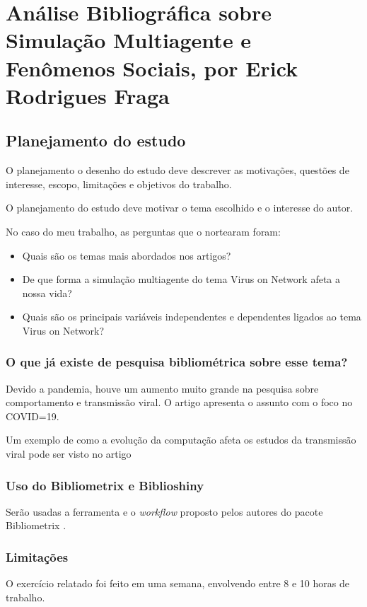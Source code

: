 \chapter{Análise Bibliográfica sobre Simulação Multiagente e Fenômenos Sociais, por Erick Rodrigues Fraga\label{chap:bibliometria:mutenesss}}

\section{Planejamento do estudo}\label{Virus@mutenesss:questoes}
O planejamento o  desenho do estudo deve descrever as motivações, questões de interesse, escopo, limitações e objetivos do trabalho.

O planejamento do estudo deve motivar o tema escolhido e o interesse do autor.

No caso do meu trabalho, as perguntas que o nortearam foram:
\begin{itemize}
    \item Quais são os temas mais abordados nos artigos?
    \item De que forma a simulação multiagente do tema Virus on Network afeta a nossa vida?
    \item Quais são os principais variáveis independentes e dependentes ligados ao tema Virus on Network?
\end{itemize}

\subsection{O que já existe de pesquisa bibliométrica sobre esse tema?}

Devido a pandemia, houve um aumento muito grande na pesquisa sobre comportamento e transmissão viral. O artigo \cite{maheshwari_network_2020} apresenta o assunto com o foco no COVID=19.

Um exemplo de como a evolução da computação afeta os estudos da transmissão viral pode ser visto no artigo \cite{fain_gpu_2022}

\subsection{Uso do Bibliometrix e Biblioshiny}
Serão usadas a ferramenta e o \textit{workflow} proposto pelos autores do pacote Bibliometrix \cite{aria_bibliometrix_2017}.

\subsection{Limitações}
O exercício relatado foi feito em uma semana, envolvendo entre 8 e 10 horas de trabalho.

